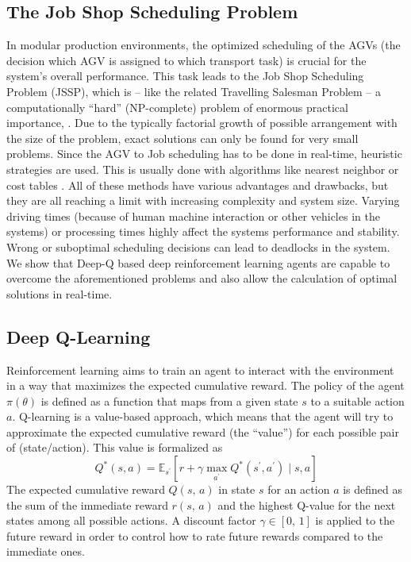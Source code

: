 \documentclass[sn-mathphys]{sn-jnl}
\begin{document}
\subsection{The Job Shop Scheduling Problem}
\label{ssec:JSSP}

In modular production environments, the optimized scheduling of the AGVs (the decision which AGV is assigned to which transport task) is crucial for the system's overall performance. This task leads to the Job Shop Scheduling Problem (JSSP), which is -- like the related Travelling Salesman Problem -- a computationally ``hard'' (NP-complete) problem of enormous practical importance, \cite{Garey1976}.
Due to the typically factorial growth of possible arrangement with the size of the problem, exact solutions can only be found for very small problems. Since the AGV to Job scheduling has to be done in real-time, heuristic strategies are used. This is usually done with algorithms like nearest neighbor \cite{10.1007/BFb0032050} or cost tables \cite{https://doi.org/10.1002/nav.3800020109}. All of these methods have various advantages and drawbacks, but they are all reaching a limit with increasing complexity and system size. Varying driving times (because of human machine interaction or other vehicles in the systems) or processing times highly affect the systems performance and stability. Wrong or suboptimal scheduling decisions can lead to deadlocks in the system.
We show that Deep-Q based deep reinforcement  learning agents are capable to overcome the aforementioned problems and also allow the calculation of optimal solutions in real-time.

\subsection{Deep Q-Learning}
\label{ssec:deep_Q}

Reinforcement learning aims to train an agent to interact with the environment in a way that maximizes the expected cumulative reward. The policy of the agent  $\pi(\theta)$ is defined as a function that maps from a given state $s$ to a suitable action $a$.
Q-learning is a value-based approach, which means that the agent will try to approximate the expected cumulative reward (the “value”) for each possible pair of (state/action). This value is formalized as
\begin{equation}
Q^{*}(s, a)=\mathbb{E}_{s^{\prime}}\left[r+\gamma \max _{a^{\prime}} Q^{*}\left(s^{\prime}, a^{\prime}\right) \mid s, a\right]
\end{equation}
The expected cumulative reward $Q(s,\,a)$ in state $s$ for an action $a$ is defined as the sum of the immediate reward $r(s,\,a)$ and the highest Q-value for the next states among all possible actions. A discount factor $\gamma\in[0,\,1]$ is applied to the future reward in order to control how to rate future rewards compared to the immediate ones.
\end{document}
